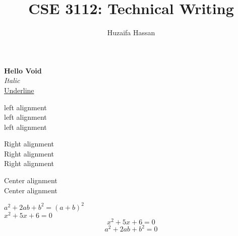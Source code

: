 \documentclass[a4paper,12pt]{report}
\title{CSE 3112: Technical Writing}
\author{Huzaifa Hassan}
\begin{document}
\textbf{Hello Void}\\
\textit{Italic}\\
\underline{Underline}\\
\begin{flushleft}
	left alignment\\ left alignment\\ left alignment\\
\end{flushleft}
\begin{flushright}
	Right alignment\\
Right alignment\\
Right alignment\\
\end{flushright}
\begin{center}
	Center alignment\\
Center alignment\\
\end{center}
$ a^2+2ab+b^2=(a+b)^2 $\\
$ x^2+5x+6=0 $\\
\begin{equation}
	x^2+5x+6=0
\end{equation}
\begin{equation}
	a^2+2ab+b^2=0
\end{equation} 
\end{document}
